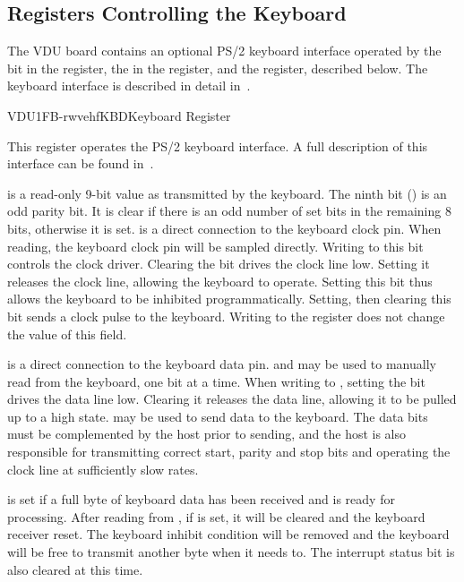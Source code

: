 \subsection{Registers Controlling the Keyboard}

The VDU board contains an optional PS/2 keyboard interface operated by the
 bit in the  register, the  in the 
register, and the  register, described below. The keyboard interface
is described in detail in~.

\begin{ioport}{VDU}{1FB}{-rwvehf}{KBD}{Keyboard Register}

  This register operates the PS/2 keyboard interface. A full description of
  this interface can be found in~.

  \begin{bitfield}
  \end{bitfield}

  \begin{description}
     is a read-only 9-bit value as transmitted by the
    keyboard. The ninth bit () is an odd parity bit. It is clear if
    there is an odd number of set bits in the remaining 8 bits, otherwise it is
    set.   is a direct connection to the keyboard clock
    pin. When reading, the keyboard clock pin will be sampled directly. Writing
    to this bit controls the clock driver. Clearing the bit drives the clock
    line low. Setting it releases the clock line, allowing the keyboard to
    operate. Setting this bit thus allows the keyboard to be inhibited
    programmatically. Setting, then clearing this bit sends a clock pulse to
    the keyboard. Writing to the  register does not change the value
    of this field.

     is a direct connection to the keyboard data pin. 
    and  may be used to manually read from the keyboard, one bit at a
    time. When writing to , setting the bit drives the data line
    low. Clearing it releases the data line, allowing it to be pulled up to a
    high state.  may be used to send data to the keyboard. The data
    bits must be complemented by the host prior to sending, and the host is
    also responsible for transmitting correct start, parity and stop bits and
    operating the clock line at sufficiently slow rates.

     is set if a full byte of keyboard data has been received
    and is ready for processing. After reading from , if 
    is set, it will be cleared and the keyboard receiver reset. The keyboard
    inhibit condition will be removed and the keyboard will be free to transmit
    another byte when it needs to. The interrupt status bit  is
    also cleared at this time.
  \end{description}
\end{ioport}




